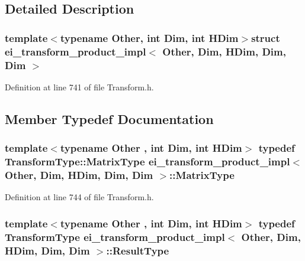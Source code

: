 \subsection{Detailed Description}
\subsubsection*{template$<$typename Other, int Dim, int H\-Dim$>$struct ei\-\_\-transform\-\_\-product\-\_\-impl$<$ Other, Dim, H\-Dim, Dim, Dim $>$}



Definition at line 741 of file Transform.\-h.



\subsection{Member Typedef Documentation}
\hypertarget{structei__transform__product__impl_3_01_other_00_01_dim_00_01_h_dim_00_01_dim_00_01_dim_01_4_a32bbc1ea8303f648d3bed3639d649522}{
\subsubsection[{Matrix\-Type}]{\setlength{\rightskip}{0pt plus 5cm}template$<$typename Other , int Dim, int H\-Dim$>$ typedef {\bf Transform\-Type\-::\-Matrix\-Type} {\bf ei\-\_\-transform\-\_\-product\-\_\-impl}$<$ Other, Dim, H\-Dim, Dim, Dim $>$\-::{\bf Matrix\-Type}}}\label{structei__transform__product__impl_3_01_other_00_01_dim_00_01_h_dim_00_01_dim_00_01_dim_01_4_a32bbc1ea8303f648d3bed3639d649522}


Definition at line 744 of file Transform.\-h.

\hypertarget{structei__transform__product__impl_3_01_other_00_01_dim_00_01_h_dim_00_01_dim_00_01_dim_01_4_a047d3a0959545e8b2849ea2d5d806578}{
\subsubsection[{Result\-Type}]{\setlength{\rightskip}{0pt plus 5cm}template$<$typename Other , int Dim, int H\-Dim$>$ typedef {\bf Transform\-Type} {\bf ei\-\_\-transform\-\_\-product\-\_\-impl}$<$ Other, Dim, H\-Dim, Dim, Dim $>$\-::{\bf Result\-Type}}}\label{structei__transform__product__impl_3_01_other_00_01_dim_00_01_h_dim_00_01_dim_00_01_dim_01_4_a047d3a0959545e8b2849ea2d5d806578}


